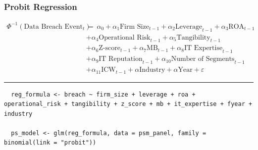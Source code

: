 \documentclass[13pt]{beamer}
\begin{document}
\begin{frame}[fragile] %
  \frametitle{Probit Regression}

  \begin{scriptsize}

    \begin{align*}
      \Phi^{-1}(\text{Data Breach Event}_{t}) & =\ \alpha_0 + \alpha_1\text{Firm Size}_{t-1} + \alpha_2\text{Leverage}_{t-1} + \alpha_3\text{ROA}_{t-1} \\
                                              & + \alpha_4\text{Operational Risk}_{t-1} + \alpha_5\text{Tangibility}_{t-1}                              \\
                                              & + \alpha_6\text{Z-score}_{t-1} + \alpha_7\text{MB}_{t-1} + \alpha_8\text{IT Expertise}_{t-1}            \\
                                              & + \alpha_9\text{IT Reputation}_{t-1} + \alpha_{10}\text{Number of Segments}_{t-1}                       \\
                                              & + \alpha_{11}\text{ICW}_{t-1} + \alpha \text{Industry} + \alpha\text{Year} + \varepsilon
    \end{align*}

  \end{scriptsize}

  \rule{\textwidth}{1pt}

  \begin{lstlisting}
  reg_formula <- breach ~ firm_size + leverage + roa + operational_risk + tangibility + z_score + mb + it_expertise + fyear + industry

  ps_model <- glm(reg_formula, data = psm_panel, family = binomial(link = "probit"))
  \end{lstlisting}


\end{frame}
\end{document}
